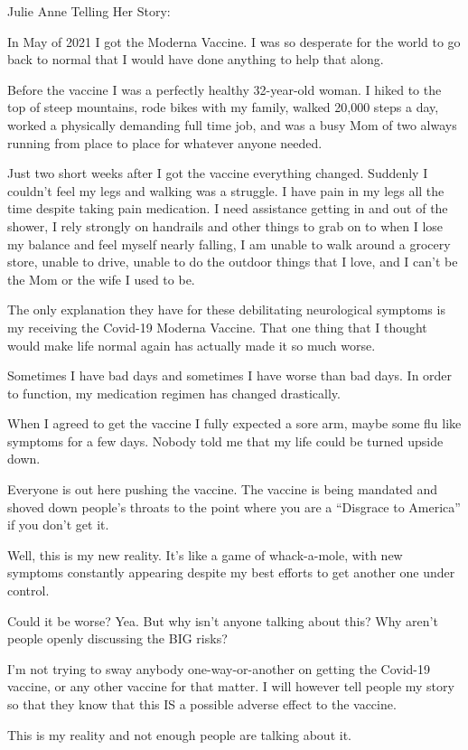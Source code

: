 Julie Anne Telling Her Story:

In May of 2021 I got the Moderna Vaccine. I was so desperate for the world to go
back to normal that I would have done anything to help that along.

Before the vaccine I was a perfectly healthy 32-year-old woman. I hiked to the
top of steep mountains, rode bikes with my family, walked 20,000 steps a day,
worked a physically demanding full time job, and was a busy Mom of two always
running from place to place for whatever anyone needed.

Just two short weeks after I got the vaccine everything changed. Suddenly I
couldn’t feel my legs and walking was a struggle. I have pain in my legs all the
time despite taking pain medication. I need assistance getting in and out of the
shower, I rely strongly on handrails and other things to grab on to when I lose
my balance and feel myself nearly falling, I am unable to walk around a grocery
store, unable to drive, unable to do the outdoor things that I love, and I can’t
be the Mom or the wife I used to be.

The only explanation they have for these debilitating neurological symptoms is
my receiving the Covid-19 Moderna Vaccine. That one thing that I thought would
make life normal again has actually made it so much worse.

Sometimes I have bad days and sometimes I have worse than bad days. In order to
function, my medication regimen has changed drastically.

When I agreed to get the vaccine I fully expected a sore arm, maybe some flu
like symptoms for a few days. Nobody told me that my life could be turned upside
down.

Everyone is out here pushing the vaccine. The vaccine is being mandated and
shoved down people’s throats to the point where you are a “Disgrace to America”
if you don’t get it.

Well, this is my new reality. It’s like a game of whack-a-mole, with new
symptoms constantly appearing despite my best efforts to get another one under
control.

Could it be worse? Yea. But why isn’t anyone talking about this? Why aren’t
people openly discussing the BIG risks?

I’m not trying to sway anybody one-way-or-another on getting the Covid-19
vaccine, or any other vaccine for that matter. I will however tell people my
story so that they know that this IS a possible adverse effect to the vaccine.

This is my reality and not enough people are talking about it.


